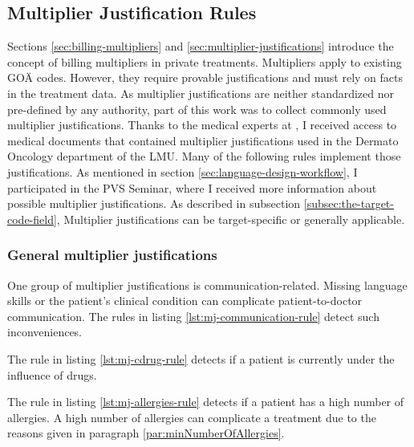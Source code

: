 \subsection{Multiplier Justification Rules}\label{subsec:multiplier-justification-rules}
Sections \ref{sec:billing-multipliers} and \ref{sec:multiplier-justifications} introduce the concept of billing multipliers in private treatments.
Multipliers apply to existing GOÄ codes.
However, they require provable justifications and must rely on facts in the treatment data.
As multiplier justifications are neither standardized nor pre-defined by any authority,
part of this work was to collect commonly used multiplier justifications.
Thanks to the medical experts at \AV, I received access to medical documents that contained multiplier justifications used in the Dermato Oncology department of the LMU.
Many of the following rules implement those justifications.
As mentioned in section \ref{sec:language-design-workflow}, I participated in the PVS Seminar, where I received more information about possible multiplier justifications.
As described in subsection \ref{subsec:the-target-code-field}, Multiplier justifications can be target-specific or generally applicable.

\subsubsection{General multiplier justifications}
One group of multiplier justifications is communication-related.
Missing language skills or the patient's clinical condition can complicate patient-to-doctor communication.
The rules in listing \ref{lst:mj-communication-rule} detect such inconveniences.


The rule in listing \ref{lst:mj-cdrug-rule} detects if a patient is currently under the influence of drugs.




The rule in listing \ref{lst:mj-allergies-rule} detects if a patient has a high number of allergies.
A high number of allergies can complicate a treatment due to the reasons given in paragraph \ref{par:minNumberOfAllergies}.




